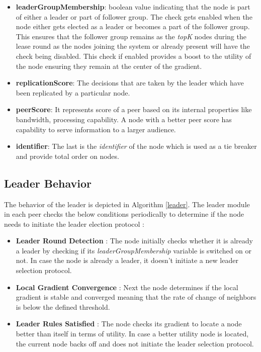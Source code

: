 \documentclass[a4paper,11pt]{kth-mag}
\begin{document}
\begin{itemize}

\item \textbf{leaderGroupMembership}: boolean value indicating that the node is part of either a leader or part of follower group.  The check gets enabled when the node either gets elected as a leader or becomes a part of the follower group. This ensures that the follower group remains as the \textit{topK} nodes during the lease round as the nodes joining the system or already present will have the check being disabled. This check if enabled provides a boost to the utility of the node ensuring they remain at the center of the gradient.

\item \textbf{replicationScore}: The decisions that are taken by the leader which have been replicated by a particular node.

\item \textbf{peerScore}: It represents score of a peer based on its internal properties like bandwidth, processing capability. A node with a better peer score has capability to serve information to a larger audience.

\item \textbf{identifier}: The last is the \textit{identifier} of the node which is used as a tie breaker and provide total order on nodes.

\end{itemize}


\subsection{Leader Behavior}

The behavior of the leader is depicted in Algorithm \ref{leader}. The leader module in each peer checks the below conditions periodically to determine if the node needs to initiate the leader election protocol :

\begin{itemize}

\item \textbf{Leader Round Detection} : The node initially checks whether it is already a leader by checking if its \textit{leaderGroupMembership} variable is switched on or not. In case the node is already a leader, it doesn't initiate a new leader selection protocol.

\item \textbf{Local Gradient Convergence} : Next the node determines if the local gradient is stable and converged meaning that the rate of change of neighbors is below the defined threshold.

\item \textbf{Leader Rules Satisfied} : The node checks its gradient to locate a node better than itself in terms of utility. In case a better utility node is located, the current node backs off and does not initiate the leader selection protocol.

\end{itemize}
\end{document}
